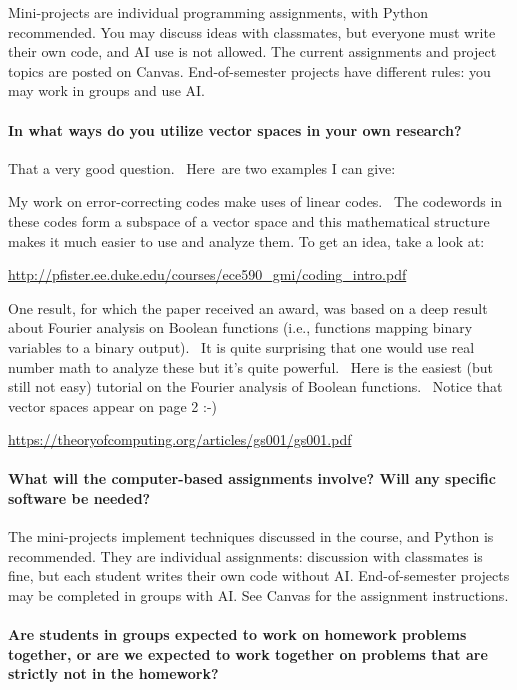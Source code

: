 \documentclass[10pt,english]{article}
\begin{document}
Mini-projects are individual programming assignments, with Python recommended.
You may discuss ideas with classmates, but everyone must write their own code, and AI use is not allowed.
The current assignments and project topics are posted on Canvas.
End-of-semester projects have different rules: you may work in groups and use AI.


\paragraph{In what ways do you utilize vector spaces in your own research?}

That a very good question.  Here are two examples I can give:

My work on error-correcting codes make uses of linear codes.  The codewords in these codes form a subspace of a vector space and this mathematical structure makes it much easier to use and analyze them. To get an idea, take a look at:
\begin{center}
\url{http://pfister.ee.duke.edu/courses/ece590_gmi/coding_intro.pdf}
\end{center}

One result, for which the paper received an award, was based on a deep result about Fourier analysis on Boolean functions (i.e., functions mapping binary variables to a binary output).  It is quite surprising that one would use real number math to analyze these but it's quite powerful.  Here is the easiest (but still not easy) tutorial on the Fourier analysis of Boolean functions.  Notice that vector spaces appear on page 2 :-)
\begin{center}
\url{https://theoryofcomputing.org/articles/gs001/gs001.pdf}
\end{center}

\paragraph{What will the computer-based assignments involve? Will any specific software be needed?}


The mini-projects implement techniques discussed in the course, and Python is recommended.
They are individual assignments: discussion with classmates is fine, but each student writes their own code without AI.
End-of-semester projects may be completed in groups with AI.
See Canvas for the assignment instructions.


\paragraph{Are students in groups expected to work on homework problems together, or are we expected to work together on problems that are strictly not in the homework?}
\end{document}
